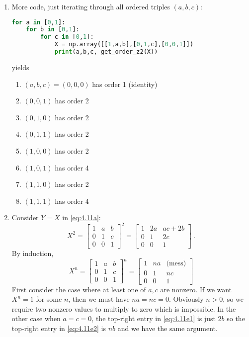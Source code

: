 \documentclass[]{article}
\begin{document}
\begin{enumerate}
\begin{enumerate}
\item More code, just iterating through all ordered triples $(a,b,c)$:
\begin{lstlisting}[language=Python]
for a in [0,1]:
    for b in [0,1]:
        for c in [0,1]:
            X = np.array([[1,a,b],[0,1,c],[0,0,1]])
            print(a,b,c, get_order_z2(X))
\end{lstlisting}
yields
\begin{enumerate}
\item $(a,b,c)=(0,0,0)$ has order 1 (identity)
\item $(0,0,1)$ has order 2
\item $(0,1,0)$ has order 2
\item $(0,1,1)$ has order 2
\item $(1,0,0)$ has order 2
\item $(1,0,1)$ has order 4
\item $(1,1,0)$ has order 2
\item $(1,1,1)$ has order 4
\end{enumerate}

\item Consider $Y=X$ in \eqref{eq:4.11a}:
\begin{equation}
X^2 = \begin{bmatrix}1&a&b\\0&1&c\\0&0&1\end{bmatrix}^2 = \begin{bmatrix}1&2a&ac+2b\\0&1&2c\\0&0&1\end{bmatrix}\ . \label{eq:4.11e1}
\end{equation}
By induction,
\begin{equation}
X^n = \begin{bmatrix}1&a&b\\0&1&c\\0&0&1\end{bmatrix}^n = \begin{bmatrix}1&na&\text{(mess)}\\0&1&nc\\0&0&1\end{bmatrix} \label{eq:4.11e2}
\end{equation}
First consider the case where at least one of $a,c$ are nonzero. If we want $X^n = 1$ for some $n$, then we must have $na = nc = 0$. Obviously $n>0$, so we require two nonzero values to multiply to zero which is impossible. In the other case when $a=c=0$, the top-right entry in \eqref{eq:4.11e1} is just $2b$ so the top-right entry in \eqref{eq:4.11e2} is $nb$ and we have the same argument.


\end{enumerate}

\end{enumerate}
\end{document}
